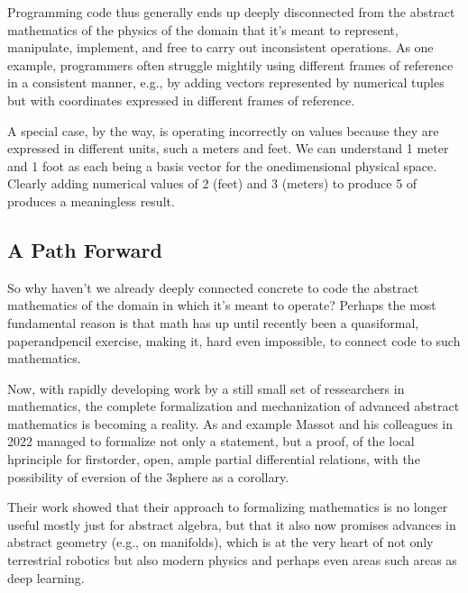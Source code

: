 \documentclass[letterpaper,10pt,english]{sphinxmanual}
\begin{document}
\sphinxAtStartPar
Programming code thus generally ends up deeply disconnected
from the abstract mathematics of the physics of the domain that
it’s meant to represent, manipulate, implement, and free to
carry out inconsistent operations. As one example, programmers
often struggle mightily using different frames of reference in
a consistent manner, e.g., by adding vectors represented by
numerical tuples but with coordinates expressed in different
frames of reference.

\sphinxAtStartPar
A special case, by the way, is operating incorrectly on values
because they are expressed in different units, such a meters
and feet. We can understand 1 meter and 1 foot as each being
a basis vector for the  one\sphinxhyphen{}dimensional physical space.
Clearly adding numerical values of 2 (feet) and 3 (meters) to
produce 5 of  produces a meaningless result.


\subsection{A Path Forward}
\label{\detokenize{A_00_Introduction:a-path-forward}}
\sphinxAtStartPar
So why haven’t we already deeply connected concrete to code
the abstract mathematics of the domain in which it’s meant
to operate? Perhaps the most fundamental reason is that math
has up until recently been a quasi\sphinxhyphen{}formal, paper\sphinxhyphen{}and\sphinxhyphen{}pencil
exercise, making it, hard even impossible, to connect code
to such mathematics.

\sphinxAtStartPar
Now, with rapidly developing work by a still small set of
ressearchers in mathematics, the complete formalization and
mechanization of advanced abstract mathematics is becoming
a reality. As and example Massot and his colleagues in 2022
managed to formalize not only a statement, but a proof, of
the local h\sphinxhyphen{}principle for first\sphinxhyphen{}order, open, ample partial
differential relations, with the possibility of eversion of
the 3\sphinxhyphen{}sphere as a corollary.

\sphinxAtStartPar
Their work showed that their approach to formalizing
mathematics is no longer useful mostly just for abstract
algebra, but that it also now promises advances in abstract
geometry (e.g., on manifolds), which is at the very heart
of not only terrestrial robotics but also modern physics
and perhaps even areas such areas as deep learning.
\end{document}
